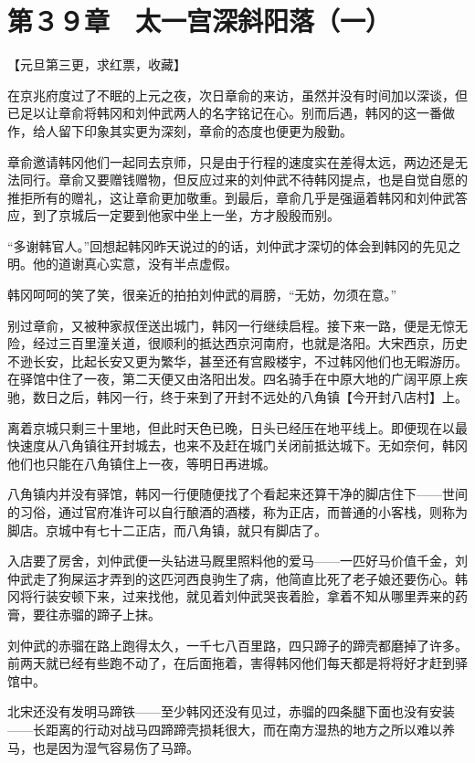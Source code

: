 \section{第３９章　太一宫深斜阳落（一）}

【元旦第三更，求红票，收藏】

在京兆府度过了不眠的上元之夜，次日章俞的来访，虽然并没有时间加以深谈，但已足以让章俞将韩冈和刘仲武两人的名字铭记在心。别而后遇，韩冈的这一番做作，给人留下印象其实更为深刻，章俞的态度也便更为殷勤。

章俞邀请韩冈他们一起同去京师，只是由于行程的速度实在差得太远，两边还是无法同行。章俞又要赠钱赠物，但反应过来的刘仲武不待韩冈提点，也是自觉自愿的推拒所有的赠礼，这让章俞更加敬重。到最后，章俞几乎是强逼着韩冈和刘仲武答应，到了京城后一定要到他家中坐上一坐，方才殷殷而别。

“多谢韩官人。”回想起韩冈昨天说过的的话，刘仲武才深切的体会到韩冈的先见之明。他的道谢真心实意，没有半点虚假。

韩冈呵呵的笑了笑，很亲近的拍拍刘仲武的肩膀，“无妨，勿须在意。”

别过章俞，又被种家叔侄送出城门，韩冈一行继续启程。接下来一路，便是无惊无险，经过三百里潼关道，很顺利的抵达西京河南府，也就是洛阳。大宋西京，历史不逊长安，比起长安又更为繁华，甚至还有宫殿楼宇，不过韩冈他们也无暇游历。在驿馆中住了一夜，第二天便又由洛阳出发。四名骑手在中原大地的广阔平原上疾驰，数日之后，韩冈一行，终于来到了开封不远处的八角镇【今开封八店村】上。

离着京城只剩三十里地，但此时天色已晚，日头已经压在地平线上。即便现在以最快速度从八角镇往开封城去，也来不及赶在城门关闭前抵达城下。无如奈何，韩冈他们也只能在八角镇住上一夜，等明日再进城。

八角镇内并没有驿馆，韩冈一行便随便找了个看起来还算干净的脚店住下——世间的习俗，通过官府准许可以自行酿酒的酒楼，称为正店，而普通的小客栈，则称为脚店。京城中有七十二正店，而八角镇，就只有脚店了。

入店要了房舍，刘仲武便一头钻进马厩里照料他的爱马——一匹好马价值千金，刘仲武走了狗屎运才弄到的这匹河西良驹生了病，他简直比死了老子娘还要伤心。韩冈将行装安顿下来，过来找他，就见着刘仲武哭丧着脸，拿着不知从哪里弄来的药膏，要往赤骝的蹄子上抹。

刘仲武的赤骝在路上跑得太久，一千七八百里路，四只蹄子的蹄壳都磨掉了许多。前两天就已经有些跑不动了，在后面拖着，害得韩冈他们每天都是将将好才赶到驿馆中。

北宋还没有发明马蹄铁——至少韩冈还没有见过，赤骝的四条腿下面也没有安装——长距离的行动对战马四蹄蹄壳损耗很大，而在南方湿热的地方之所以难以养马，也是因为湿气容易伤了马蹄。

